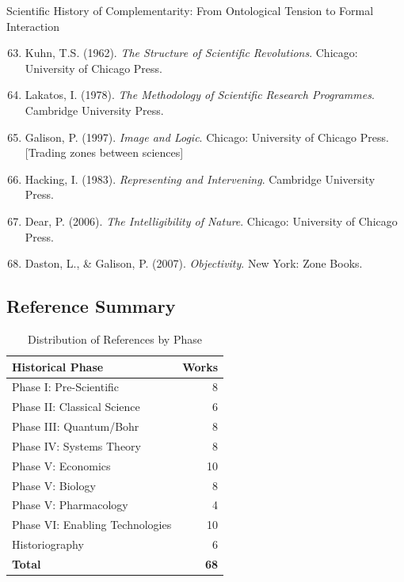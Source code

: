 \begin{chapter}{Scientific History of Complementarity: From Ontological Tension to Formal Interaction}
\begin{enumerate}
    \setcounter{enumi}{62}
    \item Kuhn, T.S. (1962). \textit{The Structure of Scientific Revolutions}. Chicago: University of Chicago Press.

    \item Lakatos, I. (1978). \textit{The Methodology of Scientific Research Programmes}. Cambridge University Press.

    \item Galison, P. (1997). \textit{Image and Logic}. Chicago: University of Chicago Press. [Trading zones between sciences]

    \item Hacking, I. (1983). \textit{Representing and Intervening}. Cambridge University Press.

    \item Dear, P. (2006). \textit{The Intelligibility of Nature}. Chicago: University of Chicago Press.

    \item Daston, L., \& Galison, P. (2007). \textit{Objectivity}. New York: Zone Books.
\end{enumerate}

\subsection{Reference Summary}

\begin{table}[h]
\centering
\caption{Distribution of References by Phase}
\label{tab:ref-summary}
\renewcommand{\arraystretch}{1.2}
\begin{tabular}{@{}lr@{}}
\toprule
\textbf{Historical Phase} & \textbf{Works} \\
\midrule
Phase I: Pre-Scientific & 8 \\
Phase II: Classical Science & 6 \\
Phase III: Quantum/Bohr & 8 \\
Phase IV: Systems Theory & 8 \\
Phase V: Economics & 10 \\
Phase V: Biology & 8 \\
Phase V: Pharmacology & 4 \\
Phase VI: Enabling Technologies & 10 \\
Historiography & 6 \\
\midrule
\textbf{Total} & \textbf{68} \\
\bottomrule
\end{tabular}
\end{table}


\end{chapter}

